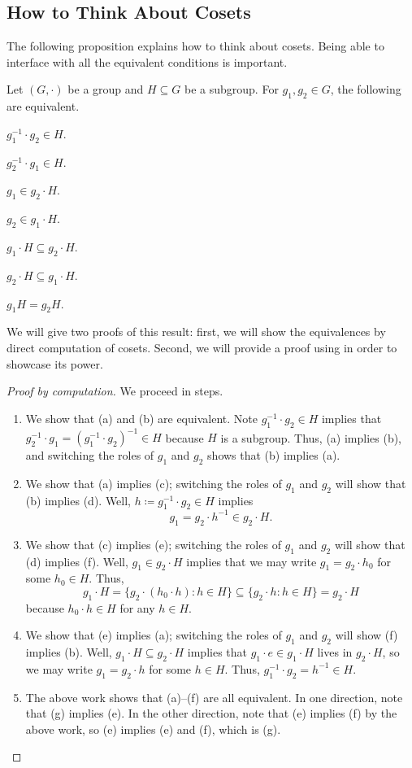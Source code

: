 \documentclass[../main.tex]{subfiles}
\begin{document}
\subsection{How to Think About Cosets}
The following proposition explains how to think about cosets. Being able to interface with all the equivalent conditions is important.
\begin{proposition} \label{prop:how-to-coset}
    Let $(G,\cdot)$ be a group and $H\subseteq G$ be a subgroup. For $g_1,g_2\in G$, the following are equivalent.
    \begin{listalph}
        \item $g_1^{-1}\cdot g_2\in H$.
        \item $g_2^{-1}\cdot g_1\in H$.
        \item $g_1\in g_2\cdot H$.
        \item $g_2\in g_1\cdot H$.
        \item $g_1\cdot H\subseteq g_2\cdot H$.
        \item $g_2\cdot H\subseteq g_1\cdot H$.
        \item $g_1H=g_2H$.
    \end{listalph}
\end{proposition}
We will give two proofs of this result: first, we will show the equivalences by direct computation of cosets. Second, we will provide a proof using  in order to showcase its power.
\begin{proof}[Proof by computation]
    We proceed in steps.
    \begin{enumerate}
        \item We show that (a) and (b) are equivalent. Note $g_1^{-1}\cdot g_2\in H$ implies that $g_2^{-1}\cdot g_1=\left(g_1^{-1}\cdot g_2\right)^{-1}\in H$ because $H$ is a subgroup. Thus, (a) implies (b), and switching the roles of $g_1$ and $g_2$ shows that (b) implies (a).
        \item We show that (a) implies (c); switching the roles of $g_1$ and $g_2$ will show that (b) implies (d). Well, $h\coloneqq g_1^{-1}\cdot g_2\in H$ implies
        \[g_1=g_2\cdot h^{-1}\in g_2\cdot H.\]
        \item We show that (c) implies (e); switching the roles of $g_1$ and $g_2$ will show that (d) implies (f). Well, $g_1\in g_2\cdot H$ implies that we may write $g_1=g_2\cdot h_0$ for some $h_0\in H$. Thus,
        \[g_1\cdot H=\{g_2\cdot(h_0\cdot h):h\in H\}\subseteq\{g_2\cdot h:h\in H\}=g_2\cdot H\]
        because $h_0\cdot h\in H$ for any $h\in H$.
        \item We show that (e) implies (a); switching the roles of $g_1$ and $g_2$ will show (f) implies (b). Well, $g_1\cdot H\subseteq g_2\cdot H$ implies that $g_1\cdot e\in g_1\cdot H$ lives in $g_2\cdot H$, so we may write $g_1=g_2\cdot h$ for some $h\in H$. Thus, $g_1^{-1}\cdot g_2=h^{-1}\in H$.
        \item The above work shows that (a)--(f) are all equivalent. In one direction, note that (g) implies (e). In the other direction, note that (e) implies (f) by the above work, so (e) implies (e) and (f), which is (g).
        \qedhere
    \end{enumerate}
\end{proof}
\end{document}
